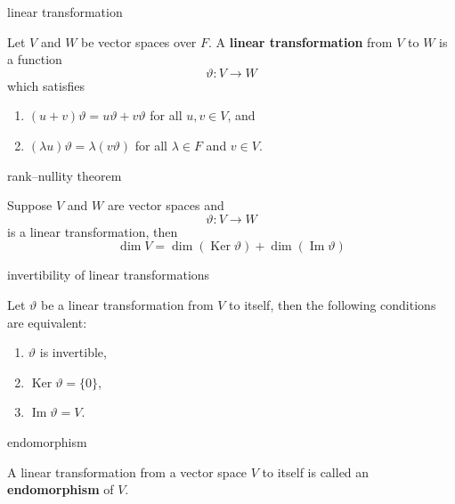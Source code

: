 \documentclass[avery5371,grid]{flashcards}
\renewcommand{\theta}{\vartheta}
\DeclareMathOperator{\Ker}{\ensuremath{\textrm{Ker}}}
\DeclareMathOperator{\Img}{\ensuremath{\textrm{Im}}}
\newcommand{\defn}[1]{\textbf{#1}}
\begin{document}
\begin{flashcard}[Definition]{linear transformation}

  Let $V$ and $W$ be vector spaces over $F$. A \defn{linear
    transformation} from $V$ to $W$ is a function
  \[
    \theta : V \to W
  \]
  which satisfies
  \begin{enumerate}
  \item $(u + v)\theta = u\theta + v\theta$ for all $u,v \in V$, and
  \item $(\lambda u)\theta = \lambda (v\theta)$ for all
    $\lambda \in F$ and $v \in V$.
  \end{enumerate}

\end{flashcard}

\begin{flashcard}[Theorem]{rank--nullity theorem}

  Suppose $V$ and $W$ are vector spaces and
  \[
    \theta : V \to W
  \]
  is a linear transformation, then
  \[
    \dim V = \dim(\Ker \theta) + \dim(\Img \theta)
  \]

\end{flashcard}

\begin{flashcard}[Theorem]{invertibility of linear transformations}

  Let $\theta$ be a linear transformation from $V$ to itself, then the
  following conditions are equivalent:
  \begin{enumerate}
  \item $\theta$ is invertible,
  \item $\Ker \theta = \{ 0 \}$,
  \item $\Img \theta  = V$.
  \end{enumerate}

\end{flashcard}

\begin{flashcard}[Definition]{endomorphism}

  A linear transformation from a vector space $V$ to itself is called
  an \defn{endomorphism} of $V$.

\end{flashcard}
\end{document}
